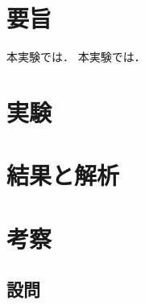 \documentclass[uplatex,dvipdfmx,a4paper,10pt]{jsarticle}
\title{}
\author{}
\begin{document}
\maketitle

\begin{abstract}\end{abstract}
	
\tableofcontents
\newpage

%
\hypertarget{ux8981ux65e8}{%
\section{要旨}\label{ux8981ux65e8}}

本実験では．\cite{化学の新研究} 本実験では．\cite{1992分析化学}

\hypertarget{ux5b9fux9a13}{%
\section{実験}\label{ux5b9fux9a13}}

\hypertarget{ux7d50ux679cux3068ux89e3ux6790}{%
\section{結果と解析}\label{ux7d50ux679cux3068ux89e3ux6790}}

\hypertarget{ux8003ux5bdf}{%
\section{考察}\label{ux8003ux5bdf}}

\hypertarget{ux8a2dux554f}{%
\subsection{設問}\label{ux8a2dux554f}}
\end{document}
